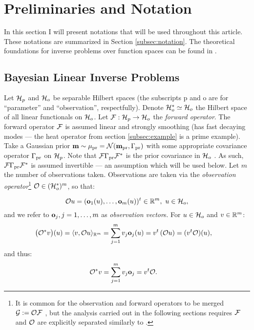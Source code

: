 \section{Preliminaries and Notation}\label{section:prelim}

In this section I will present notations that will be used throughout
this article. These notations are summarized in Section
\ref{subsec:notation}. The theoretical foundations for inverse
problems over function spaces can be found in \cite{Stuart10}.


\subsection{Bayesian Linear Inverse Problems}\label{subsec:abstract OED}
Let $\mathcal{H}_p$ and $\mathcal{H}_o$ be separable Hilbert spaces (the subscripts p
and o are for ``parameter'' and ``observation'', respectfully). Denote
$\mathcal{H}_o^* \simeq \mathcal{H}_o$ the Hilbert space of all linear functionals on
$\mathcal{H}_o$. Let $\mathcal{F}: \mathcal{H}_p \to \mathcal{H}_o$ the \emph{forward operator}. The
forward operator $\mathcal{F}$ is assumed linear and strongly smoothing (has
fast decaying modes --- the heat operator from section
\ref{subsec:example} is a prime example). Take a Gaussian prior
$\mathbf{m} \sim \mu_{\textup{pr}} = \mathcal{N}(\mathbf{m}_{\textup{pr}} ,\Gamma_{\textup{pr}})$ with some appropriate
covariance operator $\Gamma_{\textup{pr}}$ \cite{Stuart10} on $\mathcal{H}_p$. Note that
$\mathcal{F} \Gamma_{\textup{pr}} \mathcal{F}^*$ is the prior covariance in $\mathcal{H}_o$
\cite{Stuart10}. As such, $\mathcal{F} \Gamma_{\textup{pr}} \mathcal{F}^*$ is assumed invertible
--- an assumption which will be used below. Let $m$ the number of
observations taken. Observations are taken via the \emph{observation
operator}\footnote{It is common for the observation and forward
operators to be merged $\mathcal{G} := \mathcal{O} \mathcal{F}$
\cite{AlexanderianGloorGhattas14}, but the analysis carried out in the
following sections requires $\mathcal{F}$ and $\mathcal{O}$ are explicitly separated
similarly to \cite{attia2022stochastic, cvetkovic2023choosing}.} $\mathcal{O}
\in ( \mathcal{H}_o^* )^m$, so that:

\begin{equation*}%
  \obs u = (\meas_1(u), \dots, \meas_m(u) )^t \in \R^m,\ u \in \hilo,
\end{equation*}
%
%
and we refer to $\mathbf{o}_j, j=1,\dots,m$ as \emph{observation
vector}s. For $u \in \mathcal{H}_o$ and $v\in \mathbb{R}^m$:
%
%
\begin{align*}
  \big (\obs^*v \big ) (u) &= \langle v, \obs u \rangle_{\R^m} = \sum_{j=1}^m  v_j \meas_j(u)
  = v^t \left ( \obs u \right ) = (v^t \obs) (u),
\end{align*}
and thus:
\begin{align}\label{eq:obs*}
  \obs^*v &= \sum_{j=1}^m v_j \meas_j = v^t \obs.
\end{align}

